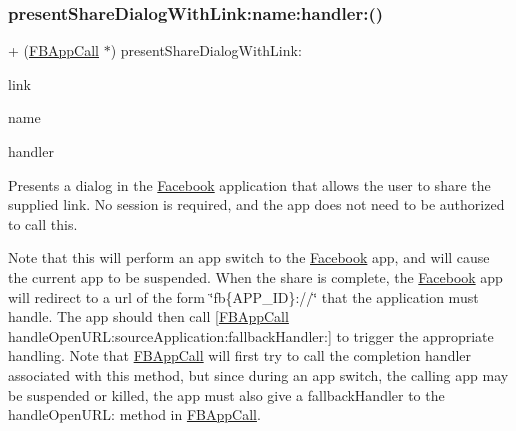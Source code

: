 \subsubsection{\texorpdfstring{present\+Share\+Dialog\+With\+Link\+:name\+:handler\+:()}{presentShareDialogWithLink:name:handler:()}\hspace{0.1cm}{\footnotesize\ttfamily [5/5]}}
{\footnotesize\ttfamily + (\hyperlink{interfaceFBAppCall}{F\+B\+App\+Call} $\ast$) present\+Share\+Dialog\+With\+Link\+: \begin{DoxyParamCaption}\item[{(N\+S\+U\+RL $\ast$)}]{link }\item[{name:(N\+S\+String $\ast$)}]{name }\item[{handler:(F\+B\+Dialog\+App\+Call\+Completion\+Handler)}]{handler }\end{DoxyParamCaption}}

Presents a dialog in the \hyperlink{interfaceFacebook}{Facebook} application that allows the user to share the supplied link. No session is required, and the app does not need to be authorized to call this.

Note that this will perform an app switch to the \hyperlink{interfaceFacebook}{Facebook} app, and will cause the current app to be suspended. When the share is complete, the \hyperlink{interfaceFacebook}{Facebook} app will redirect to a url of the form \char`\"{}fb\{\+A\+P\+P\+\_\+\+I\+D\}\+://\char`\"{} that the application must handle. The app should then call \mbox{[}\hyperlink{interfaceFBAppCall}{F\+B\+App\+Call} handle\+Open\+U\+R\+L\+:source\+Application\+:fallback\+Handler\+:\mbox{]} to trigger the appropriate handling. Note that \hyperlink{interfaceFBAppCall}{F\+B\+App\+Call} will first try to call the completion handler associated with this method, but since during an app switch, the calling app may be suspended or killed, the app must also give a fallback\+Handler to the handle\+Open\+U\+RL\+: method in \hyperlink{interfaceFBAppCall}{F\+B\+App\+Call}.


